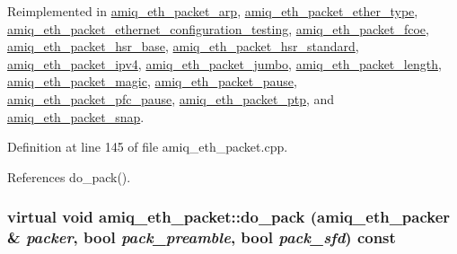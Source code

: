 Reimplemented in \hyperlink{classamiq__eth__packet__arp_aa0919231910bf804ffafd9b1b771785f}{amiq\_\-eth\_\-packet\_\-arp}, \hyperlink{classamiq__eth__packet__ether__type_a62fe5f26a466f0bd0045599b89aa6926}{amiq\_\-eth\_\-packet\_\-ether\_\-type}, \hyperlink{classamiq__eth__packet__ethernet__configuration__testing_a4ae6c0485066d7661170544fa64c7e49}{amiq\_\-eth\_\-packet\_\-ethernet\_\-configuration\_\-testing}, \hyperlink{classamiq__eth__packet__fcoe_ae119ce0a219ea22eef14da61262afbb7}{amiq\_\-eth\_\-packet\_\-fcoe}, \hyperlink{classamiq__eth__packet__hsr__base_a6dc22f94409c889f248908b1454af8b0}{amiq\_\-eth\_\-packet\_\-hsr\_\-base}, \hyperlink{classamiq__eth__packet__hsr__standard_a1dce9b763e3222c2fe257b15df912514}{amiq\_\-eth\_\-packet\_\-hsr\_\-standard}, \hyperlink{classamiq__eth__packet__ipv4_a8130e24da66bbd16c4edc7b6a608a5e9}{amiq\_\-eth\_\-packet\_\-ipv4}, \hyperlink{classamiq__eth__packet__jumbo_a1f2906c7128a79c356e152368584d2e8}{amiq\_\-eth\_\-packet\_\-jumbo}, \hyperlink{classamiq__eth__packet__length_a0e4e4b570a84eda1274ff8f0e76b45df}{amiq\_\-eth\_\-packet\_\-length}, \hyperlink{classamiq__eth__packet__magic_ad026a187c1d882aa1698a3b0d4209472}{amiq\_\-eth\_\-packet\_\-magic}, \hyperlink{classamiq__eth__packet__pause_aaea61c8cafc5274eac5d2b5428876868}{amiq\_\-eth\_\-packet\_\-pause}, \hyperlink{classamiq__eth__packet__pfc__pause_ac06dfc3d16b73113bbd42460ddbc9c4b}{amiq\_\-eth\_\-packet\_\-pfc\_\-pause}, \hyperlink{classamiq__eth__packet__ptp_a5d415af5fcb6ed2cb603aaf0105fdd43}{amiq\_\-eth\_\-packet\_\-ptp}, and \hyperlink{classamiq__eth__packet__snap_ace29c0c126f983a5e88ff933f1b34ff6}{amiq\_\-eth\_\-packet\_\-snap}.

Definition at line 145 of file amiq\_\-eth\_\-packet.cpp.

References do\_\-pack().\hypertarget{classamiq__eth__packet_a37c0f0b45e9648a710310c7c3acca77f}{
\subsubsection[{do\_\-pack}]{\setlength{\rightskip}{0pt plus 5cm}virtual void amiq\_\-eth\_\-packet::do\_\-pack ({\bf amiq\_\-eth\_\-packer} \& {\em packer}, \/  bool {\em pack\_\-preamble}, \/  bool {\em pack\_\-sfd}) const}}
\label{classamiq__eth__packet_a37c0f0b45e9648a710310c7c3acca77f}


